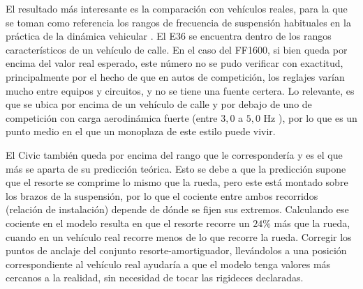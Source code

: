 El resultado más interesante es la comparación con vehículos reales, para la que se toman como referencia los rangos de frecuencia de suspensión habituales en la práctica de la dinámica vehicular \cite{giaraffa_springs1,milliken1995}. El E36 se encuentra dentro de los rangos característicos de un vehículo de calle. En el caso del FF1600, si bien queda por encima del valor real esperado, este número no se pudo verificar con exactitud, principalmente por el hecho de que en autos de competición, los reglajes varían mucho entre equipos y circuitos, y no se tiene una fuente certera. Lo relevante, es que se ubica por encima de un vehículo de calle y por debajo de uno de competición con carga aerodinámica fuerte (entre  $3{,}0$ a $5{,}0$ Hz \cite{giaraffa_springs1}), por lo que es un punto medio en el que un monoplaza de este estilo puede vivir.



El Civic también queda por encima del rango que le correspondería y es el que más se aparta de su predicción teórica. Esto se debe a que la predicción supone que el resorte se comprime lo mismo que la rueda, pero este está montado sobre los brazos de la suspensión, por lo que el cociente entre ambos recorridos (relación de instalación) depende de dónde se fijen sus extremos. Calculando ese cociente en el modelo resulta en que el resorte recorre un $24\%$ más que la rueda, cuando en un vehículo real recorre menos de lo que recorre la rueda. Corregir los puntos de anclaje del conjunto resorte-amortiguador, llevándolos a una posición correspondiente al vehículo real ayudaría a que el modelo tenga valores más cercanos a la realidad, sin necesidad de tocar las rigideces declaradas.


